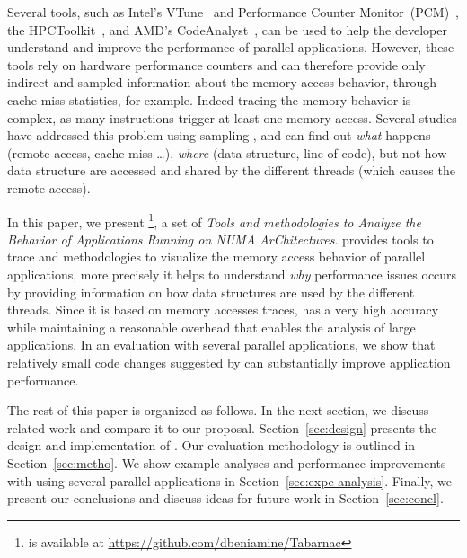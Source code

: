 Several tools, such as Intel's VTune~\cite{Reinders05VTune} and Performance Counter Monitor~(PCM)~\cite{Intel2012b}, the HPCToolkit~\cite{Adhianto10HPCTOOLKIT}, and AMD's CodeAnalyst~\cite{Drongowski2008}, can be used to help the
developer understand and improve the performance of parallel applications.
However, these tools rely on hardware performance counters and can therefore provide only indirect and sampled information about the memory access behavior, through cache miss statistics, for example.
Indeed tracing the memory behavior is complex, as many instructions trigger at least one memory access.
Several studies have addressed this problem using sampling
\cite{Lachaize12MemProf,McCurdy2010,Gimenez14Dissecting},
and can find out \emph{what} happens (remote access, cache miss \ldots),
\emph{where} (data structure, line of code), but not how data structure are
accessed and shared by the different threads (which causes the remote access).

In this paper, we present \TABARNAC\footnote{\TABARNAC is available at
    \url{https://github.com/dbeniamine/Tabarnac}}, a set of \emph{Tools and
    methodologies to Analyze the Behavior of
Applications Running on NUMA ArChitectures}. \TABARNAC provides tools to trace
and methodologies to visualize the memory access behavior of parallel
applications, more precisely it helps to understand \emph{why} performance
issues occurs by providing information on how data structures are used by the
different threads.
Since it is based on memory accesses traces, \TABARNAC has a very high
accuracy while maintaining a reasonable overhead that enables the analysis of large applications.
In an evaluation with several parallel applications, we show that relatively small code changes suggested by \TABARNAC can substantially improve application performance.

The rest of this paper is organized as follows.
In the next section, we discuss related work and compare it to our proposal.
Section~\ref{sec:design} presents the design and implementation of \TABARNAC.
Our evaluation methodology is outlined in Section~\ref{sec:metho}.
We show example analyses and performance improvements with \TABARNAC using several parallel applications in Section~\ref{sec:expe-analysis}.
Finally, we present our conclusions and discuss ideas for future work in Section~\ref{sec:concl}.
